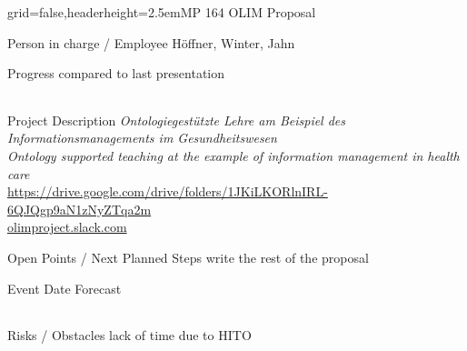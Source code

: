 \documentclass[english]{kiesgrube}
\begin{document}
\begin{poster}{grid=false,headerheight=2.5em}{}{MP 164 OLIM Proposal}{}{}
\begin{posterbox}[name=person,column=0,row=0]{Person in charge / Employee}
Höffner, Winter, Jahn
\end{posterbox}
\begin{posterbox}[name=progress,below=person]{Progress compared to last presentation}
\begin{tabulary}{\textwidth}{lL}
\end{tabulary}
\end{posterbox}
\begin{posterbox}[name=description,column=1,row=0]{Project Description}
\emph{Ontologiegestützte Lehre am Beispiel des Informationsmanagements im Gesundheitswesen}\\
\emph{Ontology supported teaching at the example of information management in health care}\\
\url{https://drive.google.com/drive/folders/1JKiLKORlnIRL-6QJQgp9aN1zNyZTqa2m}\\
\url{olimproject.slack.com}
\end{posterbox}
\begin{posterbox}[name=open,column=1,below=description]{Open Points / Next Planned Steps}
write the rest of the proposal
\end{posterbox}
\iffalse
\begin{posterbox}[name=escalation,column=1,below=open]{Escalation / Decision Needs}
\end{posterbox}
\fi
\begin{posterbox}[name=event,below=progress,]{Event Date Forecast}
\begin{tabulary}{\textwidth}{lL}
\end{tabulary}
\end{posterbox}
\begin{posterbox}[name=event,below=event]{Risks / Obstacles}
lack of time due to HITO
\end{posterbox}
\footer{}
\end{poster}
\end{document}
